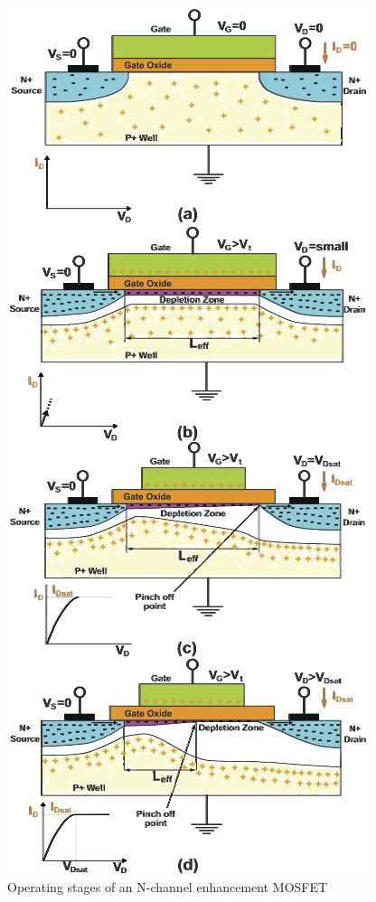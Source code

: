 \begin{figure}[H]
    \centering
    \includegraphics[width=0.74\columnwidth]{images/stages1.png}
    \caption{Operating stages of an N-channel enhancement  MOSFET}
\end{figure}


